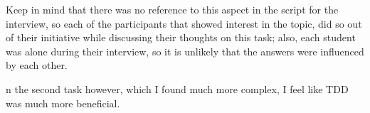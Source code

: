 Keep in mind that there was no reference to this aspect in the script for the interview, so each of the participants that showed interest in the topic, did so out of their initiative while discussing their thoughts on this task; also, each student was alone during their interview, so it is unlikely that the answers were influenced by each other.


n the second task however, which I
found much more complex, I feel like TDD was much more beneficial.